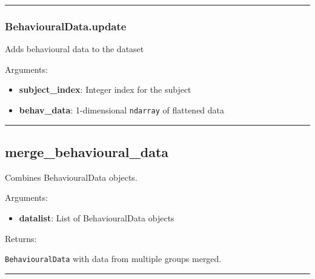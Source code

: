 \begin{center}\rule{0.5\linewidth}{\linethickness}\end{center}

\subsubsection{BehaviouralData.update}\label{behaviouraldata.update}

\begin{Shaded}
\begin{Highlighting}[]
\end{Highlighting}
\end{Shaded}

Adds behavioural data to the dataset

Arguments:

\begin{itemize}
\tightlist
\item
  \textbf{subject\_index}: Integer index for the subject
\item
  \textbf{behav\_data}: 1-dimensional \texttt{ndarray} of flattened data
\end{itemize}

\begin{center}\rule{0.5\linewidth}{\linethickness}\end{center}

\subsection{merge\_behavioural\_data}\label{merge_behavioural_data}

\begin{Shaded}
\begin{Highlighting}[]
\end{Highlighting}
\end{Shaded}

Combines BehaviouralData objects.

Arguments:

\begin{itemize}
\tightlist
\item
  \textbf{datalist}: List of BehaviouralData objects
\end{itemize}

Returns:

\texttt{BehaviouralData} with data from multiple groups merged.

\begin{center}\rule{0.5\linewidth}{\linethickness}\end{center}
